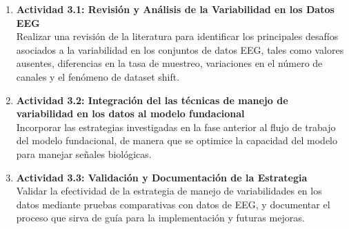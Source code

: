 \begin{enumerate}
	\item \textbf{Actividad 3.1: Revisión y Análisis de la Variabilidad en los Datos EEG}\\
	Realizar una revisión de la literatura para identificar los principales desafíos asociados a la variabilidad en los conjuntos de datos EEG, tales como valores ausentes, diferencias en la tasa de muestreo, variaciones en el número de canales y el fenómeno de dataset shift.
	
	\item \textbf{Actividad 3.2: Integración del las técnicas de manejo de variabilidad en los datos al modelo fundacional}\\
	Incorporar las estrategias investigadas en la fase anterior al flujo de trabajo del modelo fundacional, de manera que se optimice la capacidad del modelo para manejar señales biológicas.
	
	\item \textbf{Actividad 3.3: Validación y Documentación de la Estrategia}\\
	Validar la efectividad de la estrategia de manejo de variabilidades en los datos mediante pruebas comparativas con datos de EEG, y documentar el proceso que sirva de guía para la implementación y futuras mejoras.
\end{enumerate}

